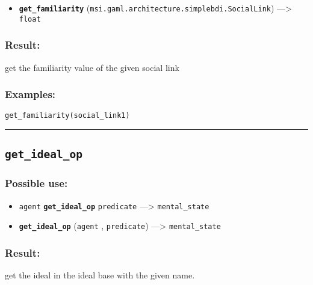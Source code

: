 \documentclass[]{book}
\providecommand{\tightlist}{%
  \setlength{\itemsep}{0pt}\setlength{\parskip}{0pt}}
\theoremstyle{definition}
\theoremstyle{definition}
\theoremstyle{definition}
\theoremstyle{remark}
\begin{document}
\begin{itemize}
\tightlist
\item
  \textbf{\texttt{get\_familiarity}}
  (\texttt{msi.gaml.architecture.simplebdi.SocialLink})
  ---\textgreater{} \texttt{float}
\end{itemize}

\subsubsection{Result:}\label{result-202}

get the familiarity value of the given social link

\subsubsection{Examples:}\label{examples-155}

\begin{verbatim}
get_familiarity(social_link1) 
\end{verbatim}

\begin{center}\rule{0.5\linewidth}{\linethickness}\end{center}

\subsection{\texorpdfstring{\texttt{get\_ideal\_op}}{get\_ideal\_op}}\label{get_ideal_op}

\subsubsection{Possible use:}\label{possible-use-209}

\begin{itemize}
\tightlist
\item
  \texttt{agent} \textbf{\texttt{get\_ideal\_op}} \texttt{predicate}
  ---\textgreater{} \texttt{mental\_state}
\item
  \textbf{\texttt{get\_ideal\_op}} (\texttt{agent} , \texttt{predicate})
  ---\textgreater{} \texttt{mental\_state}
\end{itemize}

\subsubsection{Result:}\label{result-203}

get the ideal in the ideal base with the given name.
\end{document}
